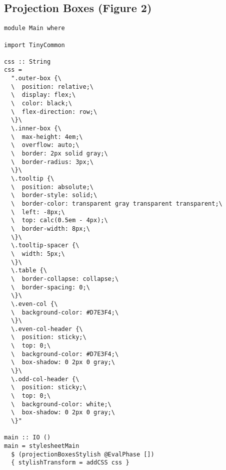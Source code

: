 \documentclass[acmsmall, screen]{acmart}
\begin{document}
\subsection{Projection Boxes (Figure 2)}
\label{sec:listing-projection-boxes}
{\scriptsize
\begin{verbatim}
module Main where

import TinyCommon

css :: String
css =
  ".outer-box {\
  \  position: relative;\
  \  display: flex;\
  \  color: black;\
  \  flex-direction: row;\
  \}\
  \.inner-box {\
  \  max-height: 4em;\
  \  overflow: auto;\
  \  border: 2px solid gray;\
  \  border-radius: 3px;\
  \}\
  \.tooltip {\
  \  position: absolute;\
  \  border-style: solid;\
  \  border-color: transparent gray transparent transparent;\
  \  left: -8px;\
  \  top: calc(0.5em - 4px);\
  \  border-width: 8px;\
  \}\
  \.tooltip-spacer {\
  \  width: 5px;\
  \}\
  \.table {\
  \  border-collapse: collapse;\
  \  border-spacing: 0;\
  \}\
  \.even-col {\
  \  background-color: #D7E3F4;\
  \}\
  \.even-col-header {\
  \  position: sticky;\
  \  top: 0;\
  \  background-color: #D7E3F4;\
  \  box-shadow: 0 2px 0 gray;\
  \}\
  \.odd-col-header {\
  \  position: sticky;\
  \  top: 0;\
  \  background-color: white;\
  \  box-shadow: 0 2px 0 gray;\
  \}"

main :: IO ()
main = stylesheetMain
  $ (projectionBoxesStylish @EvalPhase [])
  { stylishTransform = addCSS css }

\end{verbatim}}
\clearpage
\end{document}
